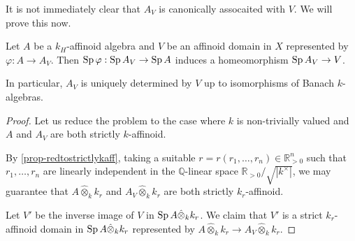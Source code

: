It is not immediately clear that $A_V$ is canonically assocaited with $V$. We will prove this now.

\begin{proposition}
    Let $A$ be a $k_H$-affinoid algebra and $V$ be an affinoid domain in $X$ represented by $\varphi:A\rightarrow A_V$. Then $\operatorname{Sp} \varphi:\operatorname{Sp} A_V\rightarrow \operatorname{Sp} A$ induces a homeomorphism $\operatorname{Sp} A_V\rightarrow V$.

    In particular, $A_V$ is uniquely determined by $V$ up to isomorphisms of Banach $k$-algebras.
\end{proposition}
\begin{proof}
    Let us reduce the problem to the case where $k$ is non-trivially valued and $A$ and $A_V$ are both strictly $k$-affinoid. 
    
    By \cref{prop-redtostrictlykaff}, taking a suitable $r=r(r_1,\ldots,r_n)\in \mathbb{R}^n_{>0}$ such that $r_1,\ldots,r_n$ are linearly independent in the $\mathbb{Q}$-linear space $\mathbb{R}_{>0}/\sqrt{|k^{\times}|}$, we may guarantee that $A\hat{\otimes}_k k_r$ and $A_V\hat{\otimes}_k k_r$ are both strictly $k_r$-affinoid.

    Let $V'$ be the inverse image of $V$ in $\operatorname{Sp} A\hat{\otimes}_k k_r$. We claim that $V'$ is a strict $k_r$-affinoid domain in $\operatorname{Sp} A\hat{\otimes}_k k_r$ represented by $A\hat{\otimes}_k k_r\rightarrow A_V\hat{\otimes}_k k_r$.
\end{proof}

\printbibliography
